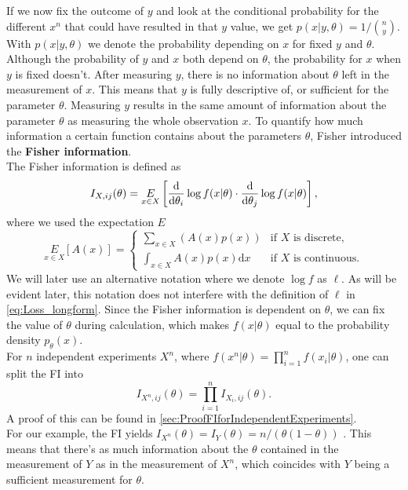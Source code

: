 If we now fix the outcome of $y$ and look at the conditional probability for the different $x^n$ that could have resulted in that $y$ value, we get $p(x|y,\theta) = 1/ \binom{n}{y}$. With $p(x|y,\theta)$ we denote the probability depending on $x$ for fixed $y$ and $\theta$. Although the probability of $y$ and $x$ both depend on $\theta$, the probability for $x$ when $y$ is fixed doesn't. After measuring $y$, there is no information about $\theta$ left in the measurement of $x$. This means that $y$ is fully descriptive of, or sufficient for the parameter $\theta$. Measuring $y$ results in the same amount of information about the parameter $\theta$ as measuring the whole observation $x$. To quantify how much information a certain function contains about the parameters $\theta$, Fisher introduced the \textbf{Fisher information}.\\
The Fisher information is defined as 
\begin{equation}\label{eq:FIDefinition}
	I_{X,ij}(\theta) = \underset{x\in X}{E} \left[\frac{\mathrm{d}}{\mathrm{d}\theta_i}\log f(x|\theta) \cdot \frac{\mathrm{d}}{\mathrm{d}\theta_j}\log f(x|\theta)\right],
\end{equation}
where we used the expectation $E$
\begin{equation}
	\underset{x\in X}{E} \left[A(x)\right] = 
	\begin{cases}
		\sum_{x\in X} \left(A(x) p(x)\right) &\text{if $X$ is discrete},\\
		\int_{x\in X} A(x) p(x) \mathrm{d}x &\text{if $X$ is continuous}.
	\end{cases}
\end{equation}
We will later use an alternative notation where we denote $\log f$ as $\ell$. As will be evident later, this notation does not interfere with the definition of $\ell$ in \cref{eq:Loss_longform}. Since the Fisher information is dependent on $\theta$, we can fix the value of $\theta$ during calculation, which makes $f(x|\theta)$ equal to the probability density $p_\theta(x)$.\\ 
For $n$ independent experiments $X^n$, where $f(x^n|\theta) = \prod_{i=1}^n f(x_i|\theta)$, one can split the FI into 
\begin{equation}\label{eq:FIforIndependentExperiments}
	I_{X^n,ij}(\theta) = \prod_{i=1}^n I_{X_i,ij}(\theta).
\end{equation}
A proof of this can be found in \cref{sec:ProofFIforIndependentExperiments}.\\
For our example, the FI yields $I_{X^n}(\theta) = I_{Y}(\theta) = n/(\theta(1-\theta))$ \cite{StatisticFisherInfoTutorial}. This means that there's as much information about the $\theta$ contained in the measurement of $Y$ as in the measurement of $X^n$, which coincides with $Y$ being a sufficient measurement for $\theta$. \\
